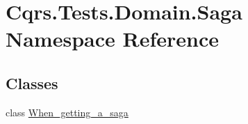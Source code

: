 \hypertarget{namespaceCqrs_1_1Tests_1_1Domain_1_1Saga}{}\section{Cqrs.\+Tests.\+Domain.\+Saga Namespace Reference}
\label{namespaceCqrs_1_1Tests_1_1Domain_1_1Saga}
\subsection*{Classes}
\begin{DoxyCompactItemize}
\item 
class \hyperlink{classCqrs_1_1Tests_1_1Domain_1_1Saga_1_1When__getting__a__saga}{When\+\_\+getting\+\_\+a\+\_\+saga}
\end{DoxyCompactItemize}

